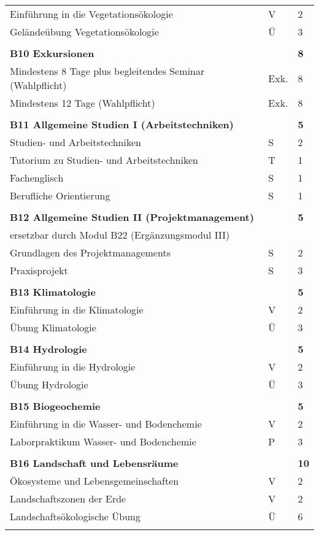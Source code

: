 \begin{longtable}{p{} p{} p{}}
Einführung in die Vegetationsökologie & V & 2 \\
Geländeübung Vegetationsökologie & Ü & 3\\
&&\\
\textbf{B10 Exkursionen}&&\textbf{8}\\
Mindestens 8 Tage plus begleitendes Seminar (Wahlpflicht) & Exk. & 8\\
Mindestens 12 Tage (Wahlpflicht) & Exk. & 8\\
&&\\
\textbf{B11 Allgemeine Studien I (Arbeitstechniken)}& & \textbf{5}\\
Studien- und Arbeitstechniken & S & 2\\
Tutorium zu Studien- und Arbeitstechniken & T & 1\\
Fachenglisch & S & 1\\
Berufliche Orientierung & S & 1\\
&&\\
\textbf{B12 Allgemeine Studien II (Projektmanagement)}&& \textbf{5}\\
ersetzbar durch Modul B22 (Ergänzungsmodul III)\\ 
Grundlagen des Projektmanagements & S & 2\\
Praxisprojekt & S & 3\\
&&\\
\textbf{B13 Klimatologie} && \textbf{5}\\
Einführung in die Klimatologie & V & 2\\
Übung Klimatologie & Ü & 3\\
&&\\
\textbf{B14 Hydrologie} && \textbf{5}\\
Einführung in die Hydrologie & V & 2\\
Übung Hydrologie &Ü&3\\
&&\\
\textbf{B15 Biogeochemie} && \textbf{5}\\
Einführung in die Wasser- und Bodenchemie & V & 2\\
Laborpraktikum Wasser- und Bodenchemie & P & 3\\
&&\\
\textbf{B16 Landschaft und Lebensräume} & & \textbf{10}\\
Ökosysteme und Lebensgemeinschaften & V & 2\\
Landschaftszonen der Erde & V & 2\\
Landschaftsökologische Übung & Ü & 6\\
&&\\

\end{longtable}

